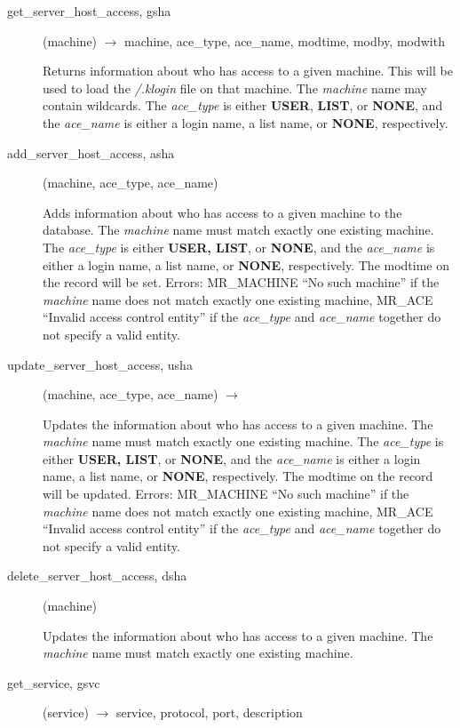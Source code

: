 \documentclass{article}
\begin{document}
\begin{description}

\item[get\_server\_host\_access, gsha](machine) $\rightarrow$ machine,
ace\_type, ace\_name, modtime, modby, modwith

Returns information about who has access to a given machine.  This
will be used to load the {\em /.klogin} file on that machine.  The
{\em machine} name may contain wildcards.  The {\em ace\_type} is either
{\bf USER}, {\bf LIST}, or {\bf NONE}, and the {\em ace\_name} is either a
login name, a list name, or {\bf NONE}, respectively.

\item[add\_server\_host\_access, asha](machine, ace\_type, ace\_name)

Adds information about who has access to a given machine to the
database.  The {\em machine} name must match exactly one existing
machine.  The {\em ace\_type} is either {\bf USER, LIST}, or {\bf NONE}, and
the {\em ace\_name} is either a login name, a list name, or {\bf NONE},
respectively.  The modtime on the record will be set.  Errors:
MR\_MACHINE ``No such machine'' if the {\em machine} name does not match
exactly one existing machine, MR\_ACE ``Invalid access control entity''
if the {\em ace\_type} and {\em ace\_name} together do not specify a valid
entity.

\item[update\_server\_host\_access, usha](machine, ace\_type, ace\_name)
$\rightarrow$

Updates the information about who has access to a given machine.  The
{\em machine} name must match exactly one existing machine.  The
{\em ace\_type} is either {\bf USER, LIST}, or {\bf NONE}, and the
{\em ace\_name} is either a login name, a list name, or {\bf NONE},
respectively.  The modtime on the record will be updated.  Errors:
MR\_MACHINE ``No such machine'' if the {\em machine} name does not match
exactly one existing machine, MR\_ACE ``Invalid access control entity''
if the {\em ace\_type} and {\em ace\_name} together do not specify a valid
entity.

\item[delete\_server\_host\_access, dsha](machine)

Updates the information about who has access to a given machine.  The
{\em machine} name must match exactly one existing machine.

\item[get\_service, gsvc](service) $\rightarrow$ service, protocol, port, description


\end{description}
\end{document}
